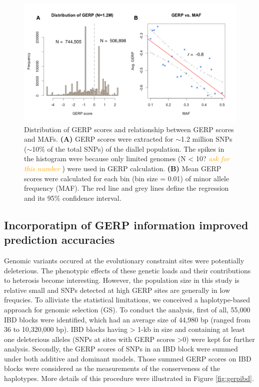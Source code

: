 \documentclass[9pt,twocolumn,twoside]{gsajnl}
\newcommand{\yang}[1]{\textcolor{orange}{\emph{\scriptsize  #1}} }
\begin{document}
\begin{figure}[htbp]
\centering
\includegraphics[width=\linewidth]{Figure_gerpmaf.pdf}
\caption{Distribution of GERP scores and relationship between GERP scores and MAFs. \textbf{(A)} GERP scores were extracted for $\sim$1.2 million SNPs ($\sim$10\% of the total SNPs) of the diallel population. The spikes in the histogram were because only limited genomes (N < 10? \yang{ask for this number}) were used in GERP calculation. \textbf{(B)} Mean GERP scores were calculated for each bin (bin size = 0.01) of minor allele frequency (MAF). The red line and grey lines define the regression and its 95\% confidence interval.}
\label{fig:gerpmaf}
\end{figure}


\subsection*{Incorporatipn of GERP information improved prediction accuracies}

Genomic variants occured at the evolutionary constraint sites were potentially deleterious. The phenotypic effects of these genetic loads and their contributions to heterosis become interesting. However, the population size in this study is relative small and SNPs detected at high GERP sites are generally in low frequcies. To alliviate the statistical limitations, we conceived a haplotype-based approach for genomic selection (GS). To conduct the analysis, first of all, 55,000 IBD blocks were identified, which had an average size of 44,980 bp (ranged from 36 to 10,320,000 bp). IBD blocks having > 1-kb in size and containing at least one deleterious alleles (SNPs at sites with GERP scores >0) were kept for further analysis. Secondly, the GERP scores of SNPs in an IBD block were summed under both additive and dominant models. Those summed GERP scores on IBD blocks were considered as the measurements of the conserveness of the haplotypes. More details of this procedure were illustrated in Figure \ref{fig:gerpibd}.   
\end{document}
